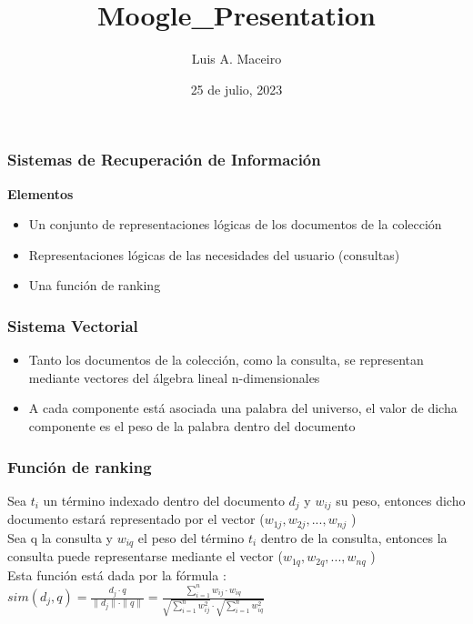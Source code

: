 \documentclass{beamer}
\begin{document}
 	
 	\title{Moogle_Presentation}
 	\author{Luis A. Maceiro}
 	\date{25 de julio, 2023}
 	
 
 \begin{frame}
 	\frametitle{Sistemas de Recuperaci\'on de Informaci\'on }
 	\textbf{Elementos }
 	\begin{itemize}
 		\item Un conjunto de representaciones l\'ogicas de los documentos de la colecci\'on 
 		\item Representaciones l\'ogicas de las necesidades del usuario (consultas)
 		\item Una funci\'on de ranking 
   \end{itemize}
 \end{frame}

\begin{frame}
	\frametitle{Sistema Vectorial}
	 \begin{itemize}
		\item Tanto los documentos de la colecci\'on, como la consulta, se representan mediante vectores del \'algebra lineal n-dimensionales
		\item A cada componente est\'a asociada una palabra del universo, el valor de dicha componente es el peso de la palabra dentro del documento
		\end{itemize}
\end{frame}

\begin{frame}
	\frametitle{Funci\'on de ranking} 
	
	 Sea $t_{i}$ un t\'ermino indexado dentro del documento $d_{j}$ y $w_{ij}$ su peso, entonces dicho documento estar\'a representado por el vector ($w_{1j}, w_{2j},..., w_{nj}$ ) \\
	 
	Sea q la consulta y $w_{iq}$ el peso del t\'ermino $t_{i}$ dentro de la consulta, entonces la consulta puede representarse mediante el vector ($w_{1q}, w_{2q},..., w_{nq}$ )\\
	
	
	 Esta funci\'on est\'a dada por la f\'ormula :\\
	$sim(d_{j}, q)= \frac{ d_{j} \cdot q}{\|d_{j}\| \cdot \|{q}\| } = \frac{ \sum_{i=1}^{n} w_{ij} \cdot w_{iq}}{ \sqrt{\sum_{i=1}^{n} w_{ij}^{2}} \cdot \sqrt{\sum_{i=1}^{n} w_{iq}^{2}}}$ \\
   \end{frame}
\end{document}
